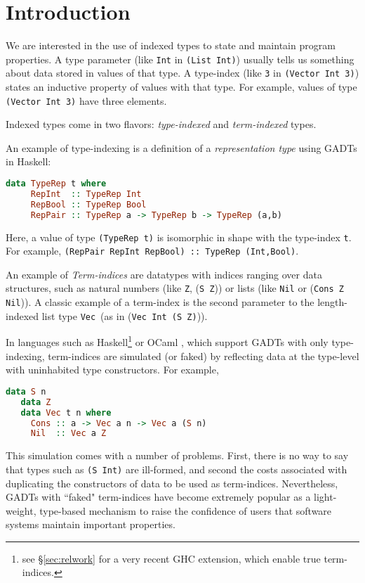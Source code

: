 \section{Introduction} \label{intro}
We are interested in the use of indexed types to state and
maintain program properties. A type parameter
(like {\tt Int} in {\tt (List Int)}) usually tells us
something about data stored in values of that type.
A type-index (like {\tt 3} in {\tt (Vector Int 3)}) states
an inductive property of values with that type. For example,
values of type {\tt (Vector Int 3)} have three elements.

Indexed types come in two flavors: \emph{type-indexed} and \emph{term-indexed}
types. 


An example of type-indexing is a definition of a \emph{representation type}
\cite{Crary98} using GADTs in Haskell:\vspace*{-2pt}
\begin{lstlisting}[basicstyle={\ttfamily\small},language=Haskell,mathescape]
   data TypeRep t where
     RepInt  :: TypeRep Int
     RepBool :: TypeRep Bool
     RepPair :: TypeRep a -> TypeRep b -> TypeRep (a,b)
\end{lstlisting}\vspace*{-2pt}
Here, a value of type {\tt\small (TypeRep t)} is isomorphic in shape with
the type-index {\tt t}. For example,
{\tt (RepPair RepInt RepBool) :: TypeRep (Int,Bool)}.


An example of {\it Term-indices} are datatypes with
indices ranging over data structures, such as natural numbers
(like {\tt Z}, {(\tt S Z})) or lists (like {\tt Nil} or ({\tt Cons Z Nil})). 
A classic example of a term-index is the second parameter to
the length-indexed list type {\tt Vec}~(as in ({\tt Vec Int (S Z)})).

In languages such as Haskell\footnote{see \S\ref{sec:relwork} for
        a very recent GHC extension, which enable true term-indices.}
        or OCaml \cite{GarNor11}, which support GADTs with only type-indexing,
term-indices are simulated (or faked) by reflecting data at the type-level
with uninhabited type constructors. For example,\vspace*{-2pt}
\begin{lstlisting}[basicstyle={\ttfamily\small},language=Haskell,mathescape]
   data S n
   data Z
   data Vec t n where
     Cons :: a -> Vec a n -> Vec a (S n)
     Nil  :: Vec a Z
\end{lstlisting}\vspace*{-2pt}
This simulation comes with a number of problems. First, there is no way to say
that types such as {\tt (S Int)} are ill-formed, and second the costs
associated with duplicating the constructors of data to be used
as term-indices.
Nevertheless, GADTs with ``faked" term-indices have become extremely popular
as a light-weight, type-based mechanism to raise the confidence of users
that software systems maintain important properties.

